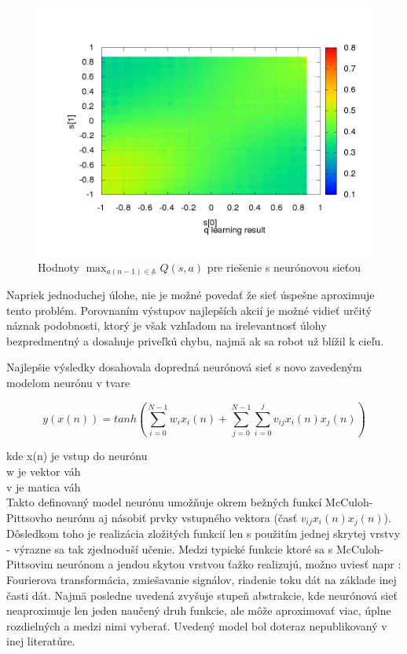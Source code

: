 \begin{figure}[!htb]
\centering
\includegraphics[scale=.4]{../../results_q_learning/experiment_divergence/testing_neuron/q_map.png}
\caption{Hodnoty $\max_{a(n-1) \in \mathbb{A}} Q(s, a)$ pre riešenie s neurónovou sieťou}
\label{img:divergence_table_q_map}
\end{figure}

Napriek jednoduchej úlohe, nie je možné povedať že sieť úspešne aproximuje tento problém.
Porovnaním výstupov najlepších akcií je možné vidieť určitý náznak podobnosti, ktorý je
však vzhľadom na irelevantnosť úlohy bezpredmentný a dosahuje priveľkú chybu, najmä
ak sa robot už blížil k cieľu.

Najlepšie výsledky dosahovala dopredná neurónová sieť s novo zavedeným modelom
neurónu v tvare

\begin{equation}
y(x(n)) = tanh(\sum\limits_{i=0}^{N-1} w_ix_i(n) + \sum\limits_{j=0}^{N-1} \sum\limits_{i=0}^{j} v_{ij}x_i(n)x_j(n))
\label{eq:neuron_model}
\end{equation}

kde
x(n) je vstup do neurónu \\
w je vektor váh \\
v je matica váh \\

Takto definovaný model neurónu umožňuje okrem bežných funkcí McCuloh-Pittsovho neurónu aj násobiť
prvky vstupného vektora (časť $v_{ij}x_i(n)x_j(n)$). Dôsledkom toho je realizácia zložitých
funkcií len s použitím jednej skrytej vrstvy - výrazne sa tak zjednoduší učenie. Medzi typické
funkcie ktoré sa s McCuloh-Pittsovim neurónom a jendou skytou vrstvou ťažko realizujú, možno uviesť napr :
Fourierova transformácia, zmiešavanie signálov, riadenie toku dát na základe inej časti dát.
Najmä posledne uvedená zvyšuje stupeň abstrakcie, kde neurónová sieť neaproximuje len jeden
naučený druh funkcie, ale môže aproximovať viac, úplne rozdielných a medzi nimi vyberať.
Uvedený model bol doteraz nepublikovaný v inej literatúre.



